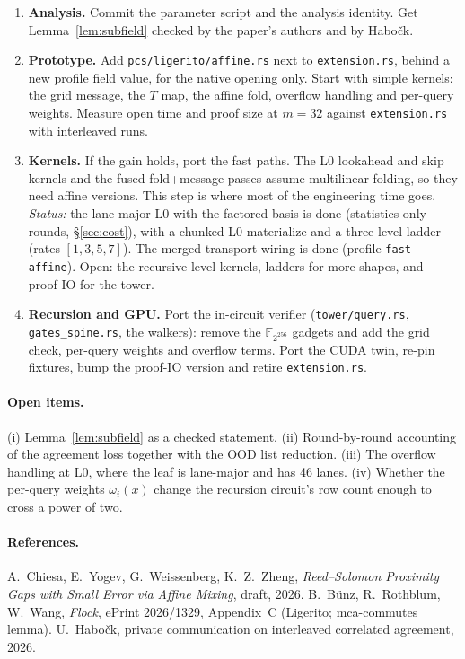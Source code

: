 \documentclass[11pt]{article}
\newcommand{\F}{\mathbb{F}}
\begin{document}
\begin{enumerate}[leftmargin=2em]
\item \textbf{Analysis.} Commit the parameter script and the analysis
  identity. Get Lemma~\ref{lem:subfield} checked by the paper's
  authors and by Habo\v{c}k.
\item \textbf{Prototype.} Add \texttt{pcs/ligerito/affine.rs} next to
  \texttt{extension.rs}, behind a new profile field value, for the
  native opening only. Start with simple kernels: the grid message,
  the $T$ map, the affine fold, overflow handling and per-query
  weights. Measure open time and proof size at $m = 32$ against
  \texttt{extension.rs} with interleaved runs.
\item \textbf{Kernels.} If the gain holds, port the fast paths. The L0
  lookahead and skip kernels and the fused fold+message passes assume
  multilinear folding, so they need affine versions. This step is
  where most of the engineering time goes. \emph{Status:} the
  lane-major L0 with the factored basis is done (statistics-only
  rounds, \S\ref{sec:cost}), with a chunked L0 materialize and a
  three-level ladder (rates $[1,3,5,7]$). The merged-transport wiring is done (profile \texttt{fast-affine}).
  Open: the recursive-level kernels, ladders for more shapes, and
  proof-IO for the tower.
\item \textbf{Recursion and GPU.} Port the in-circuit verifier
  (\texttt{tower/query.rs}, \texttt{gates\_spine.rs}, the walkers):
  remove the $\F_{2^{256}}$ gadgets and add the grid check, per-query
  weights and overflow terms. Port the CUDA twin, re-pin fixtures,
  bump the proof-IO version and retire \texttt{extension.rs}.
\end{enumerate}

\paragraph{Open items.}
(i) Lemma~\ref{lem:subfield} as a checked statement.
(ii) Round-by-round accounting of the agreement loss together with the
OOD list reduction.
(iii) The overflow handling at L0, where the leaf is lane-major and has
46 lanes.
(iv) Whether the per-query weights $\omega_i(x)$ change the
recursion circuit's row count enough to cross a power of two.

\paragraph{References.}
A.~Chiesa, E.~Yogev, G.~Weissenberg, K.~Z.~Zheng, \emph{Reed--Solomon
Proximity Gaps with Small Error via Affine Mixing}, draft, 2026.
B.~B\"unz, R.~Rothblum, W.~Wang, \emph{Flock}, ePrint 2026/1329,
Appendix~C (Ligerito; mca-commutes lemma).
U.~Habo\v{c}k, private communication on interleaved correlated
agreement, 2026.
\end{document}
